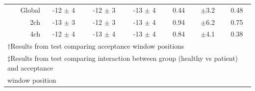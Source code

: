 \begin{landscape}
\begin{table}
\begin{tabular}{c c c c c c c}
			\multicolumn{1}{r}{Global}        & -12 $\pm$ 4 & -12 $\pm$ 3 & -13 $\pm$ 4 & 0.44 & $\pm$3.2 & 0.48  \\
			\multicolumn{1}{r}{2ch}  		  & -13 $\pm$ 3 & -12 $\pm$ 3 & -13 $\pm$ 4 & 0.94 & $\pm$6.2 & 0.75  \\
			\multicolumn{1}{r}{4ch}  		  & -12 $\pm$ 4 & -13 $\pm$ 4 & -13 $\pm$ 4 & 0.84 & $\pm$4.1 & 0.38  \\ 
			\bottomrule
			\multicolumn{7}{l}{$\dagger$Results from test comparing acceptance window positions} \\
			\multicolumn{7}{l}{$\ddagger$Results from test comparing interaction between group (healthy vs patient) and acceptance} \\
			\multicolumn{7}{l}{window position}
		\end{tabular}
	\end{table}
	\end{landscape}

